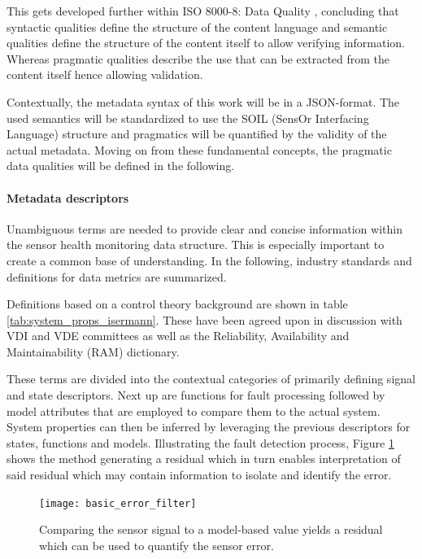 This gets developed further within ISO 8000-8: Data Quality \cite{iso_data_2015}, concluding that syntactic qualities define the structure of the content language and semantic qualities define the structure of the content itself to allow verifying information. Whereas pragmatic qualities describe the use that can be extracted from the content itself hence allowing validation.

Contextually, the metadata syntax of this work will be in a JSON-format. The used semantics will be standardized to use the SOIL (SensOr Interfacing Language) structure and pragmatics will be quantified by the validity of the actual metadata. Moving on from these fundamental concepts, the pragmatic data qualities will be defined in the following.

\paragraph{Metadata descriptors}

Unambiguous terms are needed to provide clear and concise information within the sensor health monitoring data structure. This is especially important to create a common base of understanding. In the following, industry standards and definitions for data metrics are summarized.

Definitions based on a control theory background are shown in table \ref{tab:system_props_isermann}. These have been agreed upon in discussion with VDI and VDE committees as well as the Reliability, Availability and Maintainability (RAM) dictionary. \cite{isermann_trends_1997,din_fault_1977}

These terms are divided into the contextual categories of primarily defining signal and state descriptors. Next up are functions for fault processing followed by model attributes that are employed to compare them to the actual system. System properties can then be inferred by leveraging the previous descriptors for states, functions and models. Illustrating the fault detection process, Figure \ref{fig:basic_error_filter} shows the method generating a residual which in turn enables interpretation of said residual which may contain information to isolate and identify the error.


\begin{figure}[ht]
    \centering
    \texttt{[image: basic\_error\_filter]}
    \caption[Model-Based Sensor Monitoring]{Comparing the sensor signal to a model-based value yields a residual which can be used to quantify the sensor error.}
    \label{fig:basic_error_filter}
\end{figure}




